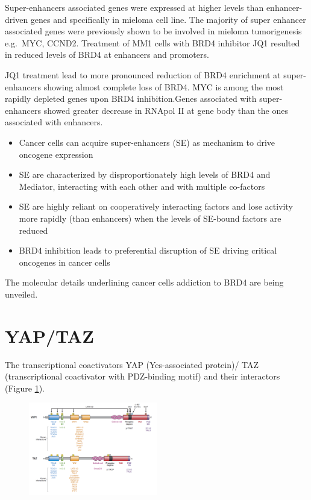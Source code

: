 Super-enhancers associated genes were expressed at higher levels than enhancer-driven genes and specifically in mieloma cell line. The majority of super enhancer associated genes were previously shown to be involved in mieloma tumorigenesis e.g.~MYC, CCND2. Treatment of MM1 cells with BRD4 inhibitor JQ1 resulted in reduced levels of BRD4 at enhancers and promoters.

JQ1 treatment lead to more pronounced reduction of BRD4 enrichment at super-enhancers showing almost complete loss of BRD4. MYC is among the most rapidly depleted genes upon BRD4 inhibition.Genes associated with super-enhancers showed greater decrease in RNApol II at gene body than the ones associated with enhancers.

\begin{itemize}
\tightlist
\item
  Cancer cells can acquire super-enhancers (SE) as mechanism to drive oncogene expression
\item
  SE are characterized by disproportionately high levels of BRD4 and Mediator, interacting with each other and with multiple co-factors
\item
  SE are highly reliant on cooperatively interacting factors and lose activity more rapidly (than enhancers) when the levels of SE-bound factors are reduced
\item
  BRD4 inhibition leads to preferential disruption of SE driving critical oncogenes in cancer cells
\end{itemize}

The molecular details underlining cancer cells addiction to BRD4 are being unveiled.

\hypertarget{yaptaz}{%
\section{YAP/TAZ}\label{yaptaz}}

The transcriptional coactivators YAP (Yes-associated protein)/ TAZ (transcriptional coactivator with PDZ-binding motif) and their interactors (Figure \ref{fig:yaptaz}).

\begin{figure}
\centering
\includegraphics[width=0.5\textwidth]{../_resources/Screen_Shot_2022-11-13_at_19-40-17.png}
\caption{}
\label{fig:yaptaz}
\end{figure}

